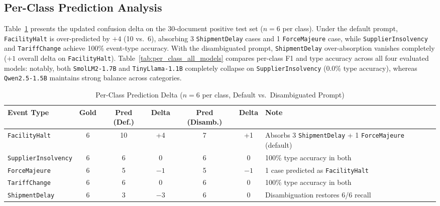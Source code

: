 \documentclass[11pt,a4paper]{article}
\begin{document}
\subsection{Per-Class Prediction Analysis}
Table~\ref{tab:pred_delta} presents the updated confusion delta on the 30-document positive test set ($n=6$ per class). Under the default prompt, \texttt{FacilityHalt} is over-predicted by $+4$ (10 vs.\ 6), absorbing 3 \texttt{ShipmentDelay} cases and 1 \texttt{ForceMajeure} case, while \texttt{SupplierInsolvency} and \texttt{TariffChange} achieve 100\% event-type accuracy. With the disambiguated prompt, \texttt{ShipmentDelay} over-absorption vanishes completely ($+1$ overall delta on \texttt{FacilityHalt}). Table~\ref{tab:per_class_all_models} compares per-class F1 and type accuracy across all four evaluated models: notably, both \texttt{SmolLM2-1.7B} and \texttt{TinyLlama-1.1B} completely collapse on \texttt{SupplierInsolvency} (0.0\% type accuracy), whereas \texttt{Qwen2.5-1.5B} maintains strong balance across categories.

\begin{table}[htbp]
\centering
\caption{Per-Class Prediction Delta ($n=6$ per class, Default vs.\ Disambiguated Prompt)}
\label{tab:pred_delta}
\small
\begin{tabular}{@{}l c c c | c c l@{}}
\toprule
\textbf{Event Type} & \textbf{Gold} & \textbf{Pred (Def.)} & \textbf{Delta} & \textbf{Pred (Disamb.)} & \textbf{Delta} & \textbf{Note} \\
\midrule
\texttt{FacilityHalt} & 6 & 10 & +4 & 7 & +1 & Absorbs 3 \texttt{ShipmentDelay} + 1 \texttt{ForceMajeure} (default) \\
\texttt{SupplierInsolvency} & 6 & 6 & 0 & 6 & 0 & 100\% type accuracy in both \\
\texttt{ForceMajeure} & 6 & 5 & $-1$ & 5 & $-1$ & 1 case predicted as \texttt{FacilityHalt} \\
\texttt{TariffChange} & 6 & 6 & 0 & 6 & 0 & 100\% type accuracy in both \\
\texttt{ShipmentDelay} & 6 & 3 & $-3$ & 6 & 0 & Disambiguation restores 6/6 recall \\
\bottomrule
\end{tabular}
\end{table}
\end{document}
